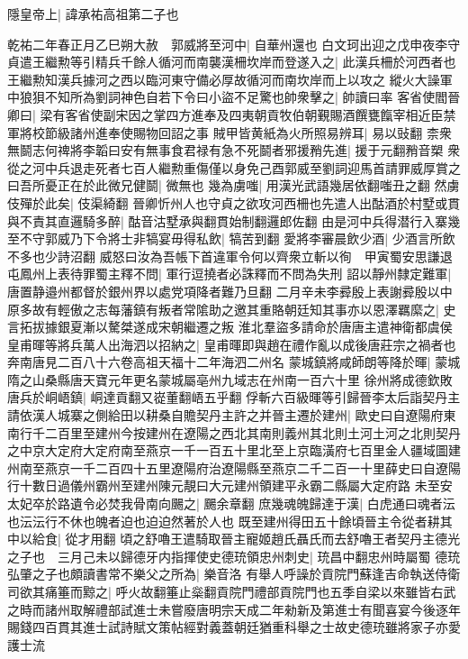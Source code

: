隱皇帝上|{
	諱承祐高祖第二子也}


乾祐二年春正月乙巳朔大赦　郭威將至河中|{
	自華州還也}
白文珂出迎之戊申夜李守貞遣王繼勲等引精兵千餘人循河而南襲漢柵坎岸而登遂入之|{
	此漢兵柵於河西者也王繼勲知漢兵據河之西以臨河東守備必厚故循河而南坎岸而上以攻之}
縱火大譟軍中狼狽不知所為劉詞神色自若下令曰小盜不足驚也帥衆擊之|{
	帥讀曰率}
客省使閻晉卿曰|{
	梁有客省使副宋因之掌四方進奉及四夷朝貢牧伯朝覲賜酒饌甕餼宰相近臣禁軍將校節級諸州進奉使賜物回詔之事}
賊甲皆黄紙為火所照易辨耳|{
	易以䜴翻}
柰衆無鬬志何禆將李韜曰安有無事食君禄有急不死鬬者邪援矟先進|{
	援于元翻矟音槊}
衆從之河中兵退走死者七百人繼勲重傷僅以身免己酉郭威至劉詞迎馬首請罪威厚賞之曰吾所憂正在於此微兄健鬬|{
	微無也}
幾為虜嗤|{
	用漢光武語幾居依翻嗤丑之翻}
然虜伎殫於此矣|{
	伎渠綺翻}
晉卿忻州人也守貞之欲攻河西柵也先遣人出酤酒於村墅或貫與不責其直邏騎多醉|{
	酤音沽墅承與翻貫始制翻邏郎佐翻}
由是河中兵得潜行入寨幾至不守郭威乃下令將士非犒宴毋得私飲|{
	犒苦到翻}
愛將李審晨飲少酒|{
	少酒言所飲不多也少詩沼翻}
威怒曰汝為吾帳下首違軍令何以齊衆立斬以徇　甲寅蜀安思謙退屯鳳州上表待罪蜀主釋不問|{
	軍行逗撓者必誅釋而不問為失刑}
詔以靜州隸定難軍|{
	唐置静邉州都督於銀州界以處党項降者難乃旦翻}
二月辛未李彛殷上表謝彛殷以中原多故有輕傲之志每藩鎮有叛者常隂助之邀其重賂朝廷知其事亦以恩澤羈縻之|{
	史言拓拔據銀夏漸以驁桀遂成宋朝繼遷之叛}
淮北羣盜多請命於唐唐主遣神衛都虞侯皇甫暉等將兵萬人出海泗以招納之|{
	皇甫暉即與趙在禮作亂以成後唐莊宗之禍者也奔南唐見二百八十六卷高祖天福十二年海泗二州名}
蒙城鎮將咸師朗等降於暉|{
	蒙城隋之山桑縣唐天寶元年更名蒙城屬亳州九域志在州南一百六十里}
徐州將成德欽敗唐兵於峒峿鎮|{
	峒達貢翻又嵸董翻峿五乎翻}
俘斬六百級暉等引歸晉李太后詣契丹主請依漢人城寨之側給田以耕桑自贍契丹主許之并晉主遷於建州|{
	歐史曰自遼陽府東南行千二百里至建州今按建州在遼陽之西北其南則義州其北則土河土河之北則契丹之中京大定府大定府南至燕京一千一百五十里北至上京臨潢府七百里金人疆域圖建州南至燕京一千二百四十五里遼陽府治遼陽縣至燕京二千二百一十里薛史曰自遼陽行十數日過儀州霸州至建州陳元靚曰大元建州領建平永霸二縣屬大定府路}
未至安太妃卒於路遺令必焚我骨南向颺之|{
	颺余章翻}
庶幾魂魄歸達于漢|{
	白虎通曰魂者沄也沄沄行不休也魄者迫也迫迫然著於人也}
既至建州得田五十餘頃晉主令從者耕其中以給食|{
	從才用翻}
頃之舒嚕王遣騎取晉主寵姬趙氏聶氏而去舒嚕王者契丹主德光之子也　三月己未以歸德牙内指揮使史德珫領忠州刺史|{
	珫昌中翻忠州時屬蜀}
德珫弘肇之子也頗讀書常不樂父之所為|{
	樂音洛}
有舉人呼譟於貢院門蘇逢吉命執送侍衛司欲其痛箠而黥之|{
	呼火故翻箠止橤翻貢院門禮部貢院門也五季自梁以來雖皆右武之時而諸州取解禮部試進士未嘗廢唐明宗天成二年勑新及第進士有聞喜宴今後逐年賜錢四百貫其進士試詩賦文策帖經對義蓋朝廷猶重科舉之士故史德珫雖將家子亦愛護士流}
